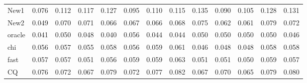 \documentclass[review]{elsarticle}
\theoremstyle{plain}
\theoremstyle{definition}
\theoremstyle{remark}
\begin{document}
\begin{table}[ht]
\begin{tabular}{lllllllllllll}
New1 & 0.076 & 0.112 & 0.117 & 0.127 & 0.095 & 0.110 & 0.115 & 0.135 & 0.090 & 0.105 & 0.128 & 0.131 \\ 
New2 & 0.049 & 0.070 & 0.071 & 0.066 & 0.067 & 0.066 & 0.068 & 0.075 & 0.062 & 0.061 & 0.079 & 0.072 \\ 
oracle & 0.041 & 0.050 & 0.048 & 0.040 & 0.056 & 0.044 & 0.044 & 0.050 & 0.050 & 0.050 & 0.050 & 0.046 \\ 
chi & 0.056 & 0.057 & 0.055 & 0.058 & 0.056 & 0.059 & 0.061 & 0.046 & 0.048 & 0.048 & 0.058 & 0.058 \\ 
fast & 0.057 & 0.057 & 0.051 & 0.056 & 0.059 & 0.059 & 0.063 & 0.051 & 0.051 & 0.050 & 0.059 & 0.057 \\ 
 CQ & 0.076 & 0.072 & 0.067 & 0.079 & 0.072 & 0.077 & 0.082 & 0.067 & 0.070 & 0.065 & 0.079 & 0.080 \\ 
\bottomrule
\end{tabular}
\end{table}



%
\end{document}
